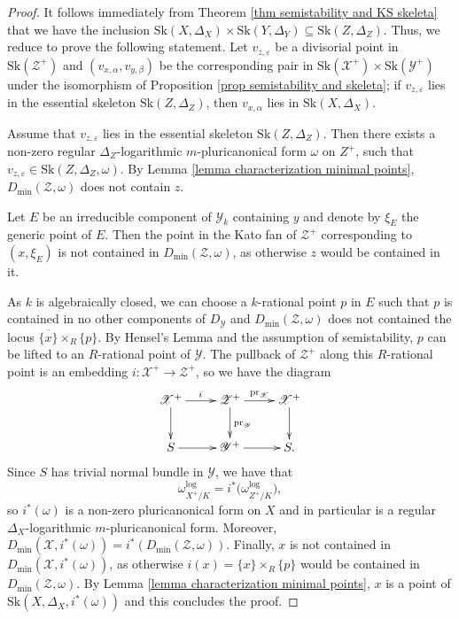\documentclass{amsart}%
\numberwithin{equation}{subsection}
\theoremstyle{plain2}
\theoremstyle{definition2}
\theoremstyle{stepstyle}
\theoremstyle{point}
\theoremstyle{subpoint}
\newcommand{\cX}{\ensuremath{\mathscr{X}}}
\newcommand{\cY}{\ensuremath{\mathscr{Y}}}
\newcommand{\cZ}{\ensuremath{\mathscr{Z}}}
\renewcommand{\cY}{\ensuremath{\mathscr{Y}}}
\newcommand{\pr}{\mathrm{pr}}
\newcommand{\Sk}{\mathrm{Sk}}
\begin{document}
\begin{proof}
It follows immediately from Theorem \ref{thm semistability and KS skeleta} that we have the inclusion $ \Sk(X,\Delta_X) \times \Sk(Y,\Delta_Y) \subseteq \Sk(Z,\Delta_Z)$. Thus, we reduce to prove the following statement. Let $v_{z,\varepsilon}$ be a divisorial point in $\Sk(\cZ^+)$ and $(v_{x,\alpha},v_{y,\beta})$ be the corresponding pair in $\Sk(\cX^+) \times \Sk(\cY^+)$ under the isomorphism of Proposition \ref{prop semistability and skeleta}; if $v_{z,\varepsilon}$ lies in the essential skeleton $\Sk(Z,\Delta_Z)$, then $v_{x,\alpha}$ lies in $\Sk(X,\Delta_X)$.

Assume that $v_{z,\varepsilon}$ lies in the essential skeleton $\Sk(Z,\Delta_Z)$. Then there exists a non-zero regular $\Delta_Z$-logarithmic $m$-pluricanonical form $\omega$ on $Z^+$, such that $v_{z,\varepsilon} \in \Sk(Z,\Delta_Z, \omega)$. By Lemma \ref{lemma characterization minimal points}, $D_{\min}(\cZ,\omega)$ does not contain $z$.

Let $E$ be an irreducible component of $\cY_k$ containing $y$ and denote by $\xi_E$ the generic point of $E$. Then the point in the Kato fan of $\cZ^+$ corresponding to $(x,\xi_E)$ is not contained in $D_{\min}(\cZ,\omega)$, as otherwise $z$ would be contained in it.

As $k$ is algebraically closed, we can choose a $k$-rational point $p$ in $E$ such that $p$ is contained in no other components of $D_\cY$ and $D_{\min}(\cZ,\omega)$ does not contained the locus $\overline{\{x\}} \times_R \{p\}$. By Hensel's Lemma and the assumption of semistability, $p$ can be lifted to an $R$-rational point of $\cY$. The pullback of $\cZ^+$ along this $R$-rational point is an embedding $i: \cX^+ \rightarrow \cZ^+$, so we have the diagram
\[
\xymatrix{ \cX^+ \ar[r]^i\ar[d] & \cZ^+ \ar[r]^{\pr_\cX}\ar[d]^{\pr_\cY} & \cX^+ \ar[d] \\
S \ar[r] & \cY^+\ar[r] & S.
}
\] Since $S$ has trivial normal bundle in $\cY$, we  have that $$\omega_{X^+/K}^{\log} = i^*\big(\omega_{Z^+/K}^{\log}\big),$$ so $i^*(\omega)$ is a non-zero pluricanonical form on $X$ and in particular is a regular $\Delta_X$-logarithmic $m$-pluricanonical form. Moreover, $D_{\min}(\cX,i^*(\omega)) = i^*(D_{\min}(\cZ,\omega))$. Finally, $x$ is not contained in $D_{\min}(\cX, i^*(\omega))$, as otherwise $i(x)= \{x\} \times_R \{p\}$ would be contained in $D_{\min}(\cZ,\omega)$. By Lemma \ref{lemma characterization minimal points}, $x$ is a point of $\Sk(X,\Delta_X, i^*(\omega))$ and this concludes the proof.
\end{proof}
\end{document}
